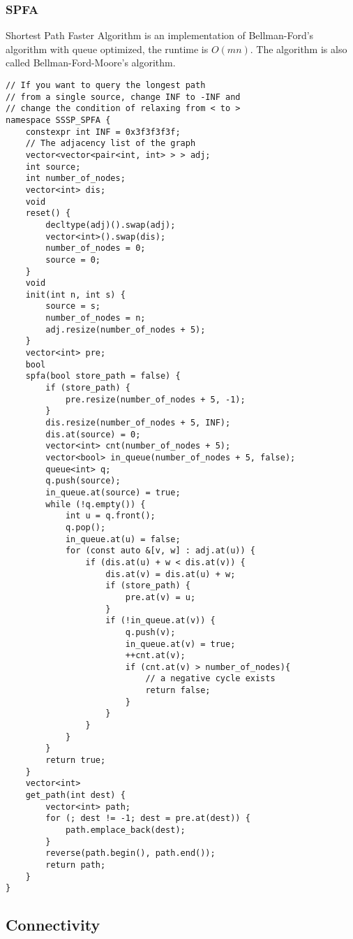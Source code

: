\documentclass[10pt]{article}{\twocolumn}
\begin{document}
\subsubsection{SPFA}
Shortest Path Faster Algorithm is an implementation of Bellman-Ford's algorithm with queue optimized, 
the runtime is $O(mn)$. The algorithm is also called Bellman-Ford-Moore's algorithm.
\begin{lstlisting}
// If you want to query the longest path
// from a single source, change INF to -INF and 
// change the condition of relaxing from < to >
namespace SSSP_SPFA {
    constexpr int INF = 0x3f3f3f3f;
    // The adjacency list of the graph
    vector<vector<pair<int, int> > > adj;
    int source;
    int number_of_nodes;
    vector<int> dis;
    void
    reset() {
        decltype(adj)().swap(adj);
        vector<int>().swap(dis);
        number_of_nodes = 0;
        source = 0;
    }
    void
    init(int n, int s) {
        source = s;
        number_of_nodes = n;
        adj.resize(number_of_nodes + 5);
    }
    vector<int> pre;
    bool
    spfa(bool store_path = false) {
        if (store_path) {
            pre.resize(number_of_nodes + 5, -1);
        }
        dis.resize(number_of_nodes + 5, INF);
        dis.at(source) = 0;
        vector<int> cnt(number_of_nodes + 5);
        vector<bool> in_queue(number_of_nodes + 5, false);
        queue<int> q;
        q.push(source);
        in_queue.at(source) = true;
        while (!q.empty()) {
            int u = q.front();
            q.pop();
            in_queue.at(u) = false;
            for (const auto &[v, w] : adj.at(u)) {
                if (dis.at(u) + w < dis.at(v)) {
                    dis.at(v) = dis.at(u) + w;
                    if (store_path) {
                        pre.at(v) = u;
                    }
                    if (!in_queue.at(v)) {
                        q.push(v);
                        in_queue.at(v) = true;
                        ++cnt.at(v);
                        if (cnt.at(v) > number_of_nodes){
                            // a negative cycle exists
                            return false;
                        }
                    }
                }
            }
        }
        return true;
    }
    vector<int>
    get_path(int dest) {
        vector<int> path;
        for (; dest != -1; dest = pre.at(dest)) {
            path.emplace_back(dest);
        }
        reverse(path.begin(), path.end());
        return path;
    }
}
\end{lstlisting}

\subsection{Connectivity}
\end{document}
